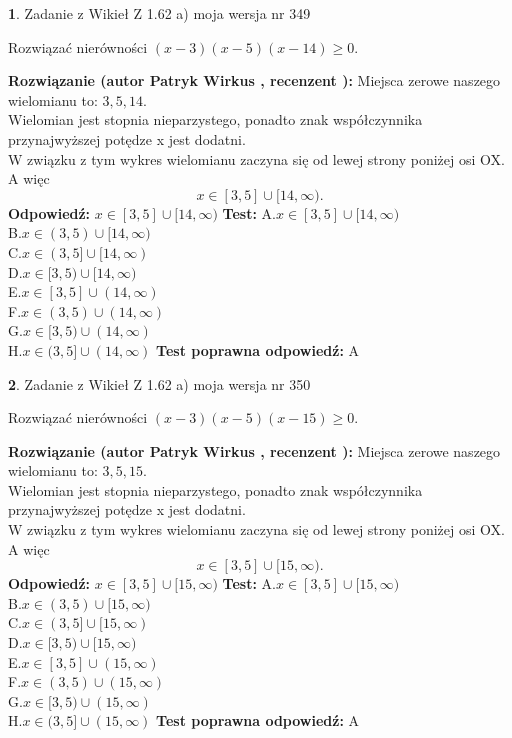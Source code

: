 \documentclass[12pt, a4paper]{article}
\theoremstyle{definition} %
\newtheorem{zad}{}
\newcommand{\zadStart}[1]{\begin{zad}#1\newline}
\newcommand{\zadStop}{\end{zad}}
\newcommand{\rozwStart}[2]{\noindent \textbf{Rozwiązanie (autor #1 , recenzent #2): }\newline}
\newcommand{\rozwStop}{\newline}
\newcommand{\odpStart}{\noindent \textbf{Odpowiedź:}\newline}
\newcommand{\odpStop}{\newline}
\newcommand{\testStart}{\noindent \textbf{Test:}\newline}
\newcommand{\testStop}{\newline}
\newcommand{\kluczStart}{\noindent \textbf{Test poprawna odpowiedź:}\newline}
\newcommand{\kluczStop}{\newline}
\begin{document}
\zadStart{Zadanie z Wikieł Z 1.62 a) moja wersja nr 349}

Rozwiązać nierówności $(x-3)(x-5)(x-14)\ge0$.
\zadStop
\rozwStart{Patryk Wirkus}{}
Miejsca zerowe naszego wielomianu to: $3, 5, 14$.\\
Wielomian jest stopnia nieparzystego, ponadto znak współczynnika przy\linebreak najwyższej potędze x jest dodatni.\\ W związku z tym wykres wielomianu zaczyna się od lewej strony poniżej osi OX. A więc $$x \in [3,5] \cup [14,\infty).$$
\rozwStop
\odpStart
$x \in [3,5] \cup [14,\infty)$
\odpStop
\testStart
A.$x \in [3,5] \cup [14,\infty)$\\
B.$x \in (3,5) \cup [14,\infty)$\\
C.$x \in (3,5] \cup [14,\infty)$\\
D.$x \in [3,5) \cup [14,\infty)$\\
E.$x \in [3,5] \cup (14,\infty)$\\
F.$x \in (3,5) \cup (14,\infty)$\\
G.$x \in [3,5) \cup (14,\infty)$\\
H.$x \in (3,5] \cup (14,\infty)$
\testStop
\kluczStart
A
\kluczStop



\zadStart{Zadanie z Wikieł Z 1.62 a) moja wersja nr 350}

Rozwiązać nierówności $(x-3)(x-5)(x-15)\ge0$.
\zadStop
\rozwStart{Patryk Wirkus}{}
Miejsca zerowe naszego wielomianu to: $3, 5, 15$.\\
Wielomian jest stopnia nieparzystego, ponadto znak współczynnika przy\linebreak najwyższej potędze x jest dodatni.\\ W związku z tym wykres wielomianu zaczyna się od lewej strony poniżej osi OX. A więc $$x \in [3,5] \cup [15,\infty).$$
\rozwStop
\odpStart
$x \in [3,5] \cup [15,\infty)$
\odpStop
\testStart
A.$x \in [3,5] \cup [15,\infty)$\\
B.$x \in (3,5) \cup [15,\infty)$\\
C.$x \in (3,5] \cup [15,\infty)$\\
D.$x \in [3,5) \cup [15,\infty)$\\
E.$x \in [3,5] \cup (15,\infty)$\\
F.$x \in (3,5) \cup (15,\infty)$\\
G.$x \in [3,5) \cup (15,\infty)$\\
H.$x \in (3,5] \cup (15,\infty)$
\testStop
\kluczStart
A
\kluczStop
\end{document}
